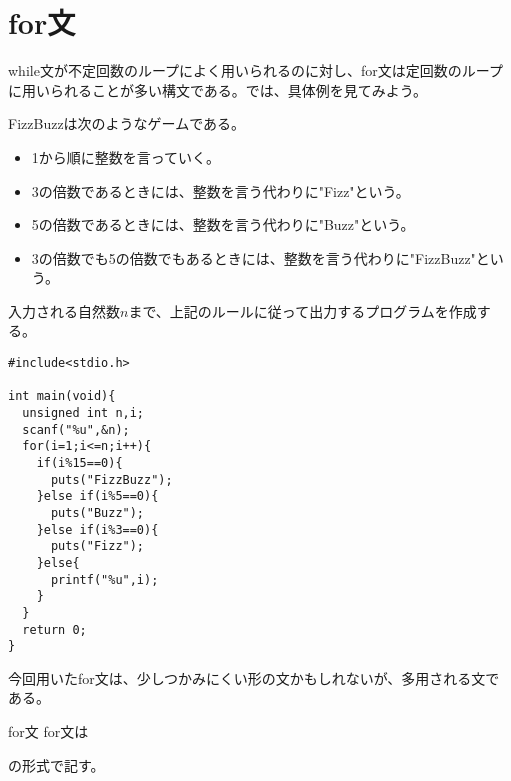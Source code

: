 \section{for文}
while文が不定回数のループによく用いられるのに対し、for文は定回数のループに用いられることが多い構文である。では、具体例を見てみよう。
\begin{boxnote}
\begin{multicols}{2}
FizzBuzzは次のようなゲームである。
\begin{itemize}
\item 1から順に整数を言っていく。
\item 3の倍数であるときには、整数を言う代わりに"Fizz"という。
\item 5の倍数であるときには、整数を言う代わりに"Buzz"という。
\item 3の倍数でも5の倍数でもあるときには、整数を言う代わりに"FizzBuzz"という。
\end{itemize}
入力される自然数$n$まで、上記のルールに従って出力するプログラムを作成する。
\begin{lstlisting}[caption=FizzBuzz,label=program5_4]
#include<stdio.h>

int main(void){
  unsigned int n,i;
  scanf("%u",&n);
  for(i=1;i<=n;i++){
    if(i%15==0){
      puts("FizzBuzz");
    }else if(i%5==0){
      puts("Buzz");
    }else if(i%3==0){
      puts("Fizz");
    }else{
      printf("%u",i);
    }
  }
  return 0;
}
\end{lstlisting}
\end{multicols}
\end{boxnote}
今回用いたfor文は、少しつかみにくい形の文かもしれないが、多用される文である。
\begin{itembox}[l]{for文}
for文は
\begin{code}
for(初期処理;条件文;終端処理)[
　処理
}
\end{code}
の形式で記す。
\end{itembox}

